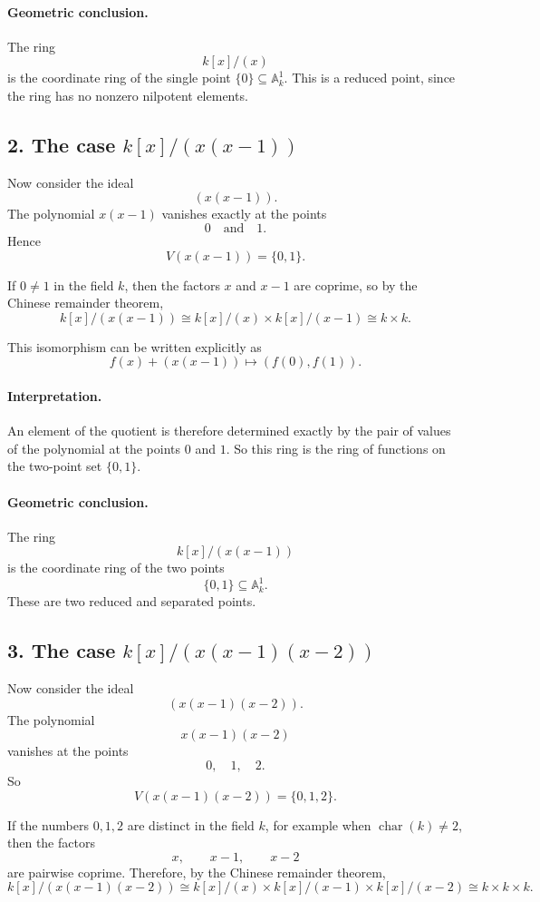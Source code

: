 \documentclass[12pt,a4paper]{article}
\theoremstyle{notespace}
\begin{document}
\paragraph{Geometric conclusion.}
The ring
\[
k[x]/(x)
\]
is the coordinate ring of the single point \(\{0\}\subseteq \mathbb A_k^1\). This is a reduced point, since the ring has no nonzero nilpotent elements.

\subsection{2. The case \(k[x]/(x(x-1))\)}

Now consider the ideal
\[
(x(x-1)).
\]
The polynomial \(x(x-1)\) vanishes exactly at the points
\[
0 \quad\text{and}\quad 1.
\]
Hence
\[
V(x(x-1))=\{0,1\}.
\]

If \(0\neq 1\) in the field \(k\), then the factors \(x\) and \(x-1\) are coprime, so by the Chinese remainder theorem,
\[
k[x]/(x(x-1))
\cong
k[x]/(x)\times k[x]/(x-1)
\cong
k\times k.
\]

This isomorphism can be written explicitly as
\[
f(x)+(x(x-1))
\longmapsto
(f(0),f(1)).
\]

\paragraph{Interpretation.}
An element of the quotient is therefore determined exactly by the pair of values of the polynomial at the points \(0\) and \(1\). So this ring is the ring of functions on the two-point set \(\{0,1\}\).

\paragraph{Geometric conclusion.}
The ring
\[
k[x]/(x(x-1))
\]
is the coordinate ring of the two points
\[
\{0,1\}\subseteq \mathbb A_k^1.
\]
These are two reduced and separated points.

\subsection{3. The case \(k[x]/(x(x-1)(x-2))\)}

Now consider the ideal
\[
(x(x-1)(x-2)).
\]
The polynomial
\[
x(x-1)(x-2)
\]
vanishes at the points
\[
0,\quad 1,\quad 2.
\]
So
\[
V(x(x-1)(x-2))=\{0,1,2\}.
\]

If the numbers \(0,1,2\) are distinct in the field \(k\), for example when \(\operatorname{char}(k)\neq 2\), then the factors
\[
x,\qquad x-1,\qquad x-2
\]
are pairwise coprime. Therefore, by the Chinese remainder theorem,
\[
k[x]/(x(x-1)(x-2))
\cong
k[x]/(x)\times k[x]/(x-1)\times k[x]/(x-2)
\cong
k\times k\times k.
\]
\end{document}
